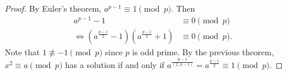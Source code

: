 \begin{proof}
    By Euler's theorem, $a^{p-1} \equiv 1 \pmod{p}$. Then
    \begin{align*}
        a^{p-1}-1 &\equiv 0 \pmod{p} \\
        \Leftrightarrow \left(a^{\frac{p-1}{2}}-1\right)\left(a^{\frac{p-1}{2}}+1\right) &\equiv 0 \pmod{p}.
    \end{align*}
    Note that $1 \not\equiv -1 \pmod{p}$ since $p$ is odd prime.
    By the previous theorem, $x^2 \equiv a \pmod{p}$ has a solution if and only if
    $a^{\frac{p-1}{\left(2,\,p-1\right)}}=a^{\frac{p-1}{2}}\equiv 1 \pmod{p}$.
\end{proof}